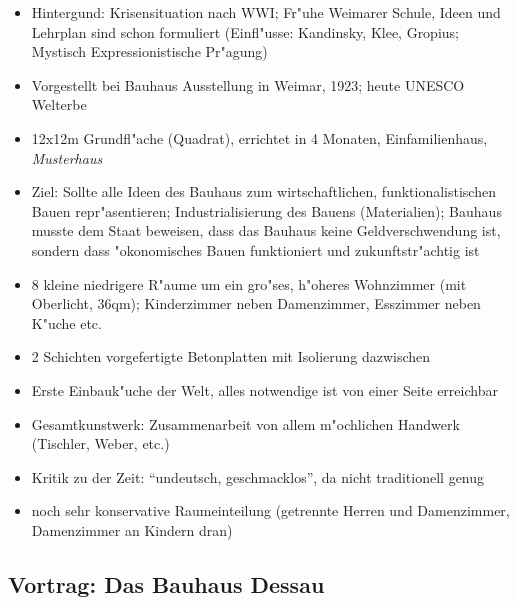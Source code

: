 \documentclass[a5paper]{scrartcl}
\begin{document}
\begin{itemize}
  \item Hintergund: Krisensituation nach WWI; Fr"uhe Weimarer Schule, Ideen und Lehrplan sind schon formuliert (Einfl"usse: Kandinsky, Klee, Gropius; Mystisch Expressionistische Pr"agung)
  \item Vorgestellt bei Bauhaus Ausstellung in Weimar, 1923; heute UNESCO Welterbe
  \item 12x12m Grundfl"ache (Quadrat), errichtet in 4 Monaten, Einfamilienhaus, \emph{Musterhaus}
  \item Ziel: Sollte alle Ideen des Bauhaus zum wirtschaftlichen, funktionalistischen Bauen repr"asentieren; Industrialisierung des Bauens (Materialien); Bauhaus musste dem Staat beweisen, dass das Bauhaus keine Geldverschwendung ist, sondern dass "okonomisches Bauen funktioniert und zukunftstr"achtig ist
  \item 8 kleine niedrigere R"aume um ein gro"ses, h"oheres Wohnzimmer (mit Oberlicht, 36qm); Kinderzimmer neben Damenzimmer, Esszimmer neben K"uche etc.
  \item 2 Schichten vorgefertigte Betonplatten mit Isolierung dazwischen
  \item Erste Einbauk"uche der Welt, alles notwendige ist von einer Seite erreichbar
  \item Gesamtkunstwerk: Zusammenarbeit von allem m"ochlichen Handwerk (Tischler, Weber, etc.)
  \item Kritik zu der Zeit: "`undeutsch, geschmacklos"', da nicht traditionell genug
  \item noch sehr konservative Raumeinteilung (getrennte Herren und Damenzimmer, Damenzimmer an Kindern dran)
\end{itemize}

\subsection{Vortrag: Das Bauhaus Dessau}
\end{document}
